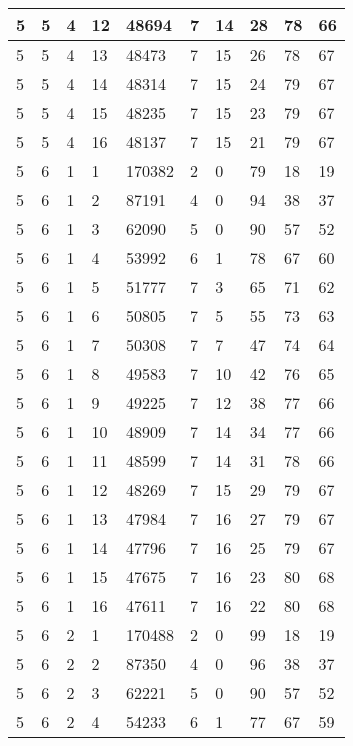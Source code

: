 \begin{table}[!ht]
\begin{tabular}{|l|l|l|l|l|l|l|l|l|l|}
        5 & 5 & 4 & 12 & 48694 & 7 & 14 & 28 & 78 & 66 \\ \hline
        5 & 5 & 4 & 13 & 48473 & 7 & 15 & 26 & 78 & 67 \\ \hline
        5 & 5 & 4 & 14 & 48314 & 7 & 15 & 24 & 79 & 67 \\ \hline
        5 & 5 & 4 & 15 & 48235 & 7 & 15 & 23 & 79 & 67 \\ \hline
        5 & 5 & 4 & 16 & 48137 & 7 & 15 & 21 & 79 & 67 \\ \hline
        5 & 6 & 1 & 1 & 170382 & 2 & 0 & 79 & 18 & 19 \\ \hline
        5 & 6 & 1 & 2 & 87191 & 4 & 0 & 94 & 38 & 37 \\ \hline
        5 & 6 & 1 & 3 & 62090 & 5 & 0 & 90 & 57 & 52 \\ \hline
        5 & 6 & 1 & 4 & 53992 & 6 & 1 & 78 & 67 & 60 \\ \hline
        5 & 6 & 1 & 5 & 51777 & 7 & 3 & 65 & 71 & 62 \\ \hline
        5 & 6 & 1 & 6 & 50805 & 7 & 5 & 55 & 73 & 63 \\ \hline
        5 & 6 & 1 & 7 & 50308 & 7 & 7 & 47 & 74 & 64 \\ \hline
        5 & 6 & 1 & 8 & 49583 & 7 & 10 & 42 & 76 & 65 \\ \hline
        5 & 6 & 1 & 9 & 49225 & 7 & 12 & 38 & 77 & 66 \\ \hline
        5 & 6 & 1 & 10 & 48909 & 7 & 14 & 34 & 77 & 66 \\ \hline
        5 & 6 & 1 & 11 & 48599 & 7 & 14 & 31 & 78 & 66 \\ \hline
        5 & 6 & 1 & 12 & 48269 & 7 & 15 & 29 & 79 & 67 \\ \hline
        5 & 6 & 1 & 13 & 47984 & 7 & 16 & 27 & 79 & 67 \\ \hline
        5 & 6 & 1 & 14 & 47796 & 7 & 16 & 25 & 79 & 67 \\ \hline
        5 & 6 & 1 & 15 & 47675 & 7 & 16 & 23 & 80 & 68 \\ \hline
        5 & 6 & 1 & 16 & 47611 & 7 & 16 & 22 & 80 & 68 \\ \hline
        5 & 6 & 2 & 1 & 170488 & 2 & 0 & 99 & 18 & 19 \\ \hline
        5 & 6 & 2 & 2 & 87350 & 4 & 0 & 96 & 38 & 37 \\ \hline
        5 & 6 & 2 & 3 & 62221 & 5 & 0 & 90 & 57 & 52 \\ \hline
        5 & 6 & 2 & 4 & 54233 & 6 & 1 & 77 & 67 & 59 \\ \hline

\end{tabular}
\end{table}
